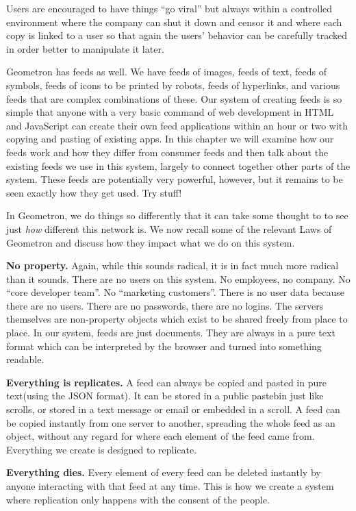 Users are encouraged to have things ``go viral'' but always within a controlled environment where the company can shut it down and censor it and where each copy is linked to a user so that again the users' behavior can be carefully tracked in order better to manipulate it later.

Geometron has feeds as well.  We have feeds of images, feeds of text, feeds of symbols, feeds of icons to be printed by robots, feeds of hyperlinks, and various feeds that are complex combinations of these.  Our system of creating feeds is so simple that anyone with a very basic command of web development in HTML and JavaScript can create their own feed applications within an hour or two with copying and pasting of existing apps.  In this chapter we will examine how our feeds work and how they differ from consumer feeds and then talk about the existing feeds we use in this system, largely to connect together other parts of the system.  These feeds are potentially very powerful, however, but it remains to be seen exactly how they get used.  Try stuff!

In Geometron, we do things so differently that it can take some thought to to see just \emph{how} different this network is.  We now recall some of the relevant Laws of Geometron and discuss how they impact what we do on this system.  

\textbf{No property.}  Again, while this sounds radical, it is in fact much more radical than it sounds.  There are no users on this system.  No employees, no company.  No ``core developer team''.  No ``marketing customers''. There is no user data because there are no users.  There are no passwords, there are no logins.  The servers themselves are non-property objects which exist to be shared freely from place to place.  In our system, feeds are just documents. They are always in a pure text format which can be interpreted by the browser and turned into something readable.  

\textbf{Everything is replicates.}  A feed can always be copied and pasted in pure text(using the JSON format). It can be stored in a public pastebin just like scrolls, or stored in a text message or email or embedded in a scroll.  A feed can be copied instantly from one server to another, spreading the whole feed as an object, without any regard for where each element of the feed came from.  Everything we create is designed to replicate.

\textbf{Everything dies.}  Every element of every feed can be deleted instantly by anyone interacting with that feed at any time.  This is how we create a system where replication only happens with the consent of the people.

